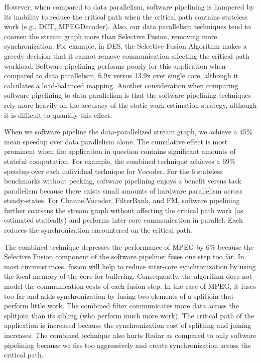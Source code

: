 However, when compared to data parallelism, software pipelining is
hampered by its inability to reduce the critical path when the
critical path contains stateless work (e.g., DCT, MPEGDecoder).  Also,
our data parallelism techniques tend to coarsen the stream graph more
than Selective Fusion, removing more synchronization.  For example, in
DES, the Selective Fusion Algorithm makes a greedy decision that it
cannot remove communication affecting the critical path workload.
Software pipelining performs poorly for this application when compared
to data parallelism, 6.9x versus 13.9x over single core, although it
calculates a load-balanced mapping.  Another consideration when
comparing software pipelining to data parallelism is that the software
pipelining techniques rely more heavily on the accuracy of the static
work estimation strategy, although it is difficult to quantify this
effect.

When we software pipeline the data-parallelized stream graph, we
achieve a 45\% mean speedup over data parallelism alone. The
cumulative effect is most prominent when the application in question
contains significant amounts of stateful computation.  For example,
the combined technique achieves a 69\% speedup over each individual
technique for Vocoder. For the 6 stateless benchmarks without peeking,
software pipelining enjoys a benefit versus task parallelism because
there exists small amounts of hardware parallelism across 
steady-states.  For ChannelVocoder, FilterBank, and FM, software
pipelining further coarsens the stream graph without affecting the
critical path work (as estimated statically) and performs inter-core
communication in parallel.  Each reduces the synchronization
encountered on the critical path.

The combined technique depresses the performance of MPEG by 6\%
because the Selective Fusion component of the software pipeliner fuses
one step too far.  In most circumstances, fusion will help to reduce
inter-core synchronization by using the local memory of the core for
buffering. Consequently, the algorithm does not model the
communication costs of each fusion step. In the case of MPEG, it fuses
too far and adds synchronization by fusing two elements of a splitjoin
that perform little work.  The combined filter communicates more data
across the splitjoin than its sibling (who perform much more work).
The critical path of the application is increased because the
synchronization cost of splitting and joining increases.  The combined
technique also hurts Radar as compared to only software pipelining
because we fiss too aggressively and create synchronization across the
critical path.

